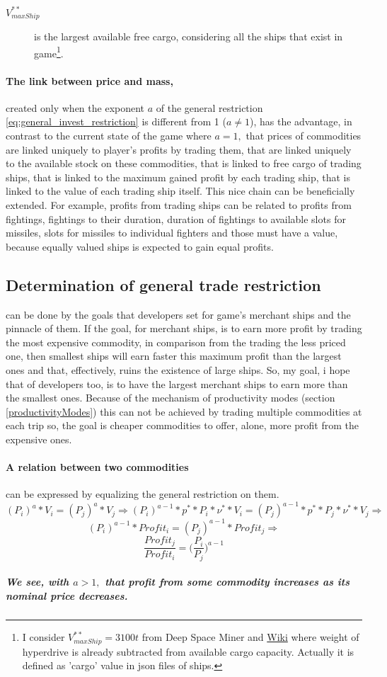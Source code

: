 \documentclass[]{article}
\begin{document}
\begin{description}
	\item[$V^{**}_{maxShip}$] is the largest available free cargo, considering all the ships that exist in game\footnote{I consider $V^{**}_{maxShip}=3100t$ from Deep Space Miner and \hyperref{https://pioneerwiki.com/wiki/Category:Ships}{}{}{Wiki} where weight of hyperdrive is already subtracted from available cargo capacity. Actually it is defined as 'cargo' value in json files of ships.}.
\end{description}
\paragraph{The link between price and mass,} created only when the exponent $a$ of the general restriction \eqref{eq:general_invest_restriction} is different from 1 ($a\neq 1$), has the advantage, in contrast to the current state of the game where $a=1,$ that prices of commodities are linked uniquely to player's profits by trading them, that are linked uniquely to the available stock on these commodities, that is linked to free cargo of trading ships, that is linked to the maximum gained profit by each trading ship, that is linked to the value of each trading ship itself. This nice chain can be beneficially extended. For example, profits from trading ships can be related to profits from fightings, fightings to their duration, duration of fightings to available slots for missiles, slots for missiles to individual fighters and those must have a value, because equally valued ships is expected to gain equal profits.
\subsection{Determination of general trade restriction} can be done by the goals that developers set for game's merchant ships and the pinnacle of them. If the goal, for merchant ships, is to earn more profit by trading the most expensive commodity, in comparison from the trading  the less priced one, then smallest ships will earn faster this maximum profit than the largest ones and that, effectively, ruins the existence of large ships. So, my goal, i hope that of developers too, is to have the largest merchant ships to earn more than the smallest ones. Because of the mechanism of productivity modes (section \ref{productivityModes}) this can not be achieved by trading multiple commodities at each trip so, the goal is cheaper commodities to offer, alone, more profit from the expensive ones.
\paragraph{A relation between two commodities} can be expressed by equalizing the general restriction on them.
\[(P_{i})^{a}*V_{i}=(P_{j})^{a}*V_{j}\Rightarrow (P_{i})^{a-1}*p^{*}*P_{i}*\nu^{*}*V_{i}=(P_{j})^{a-1}*p^{*}*P_{j}*\nu^{*}*V_{j}\Rightarrow\]
\[(P_{i})^{a-1}*Profit_{i}=(P_{j})^{a-1}*Profit_{j}\Rightarrow\]
\begin{equation}\label{eq:profitRatio_ij}
	\dfrac{Profit_{j}}{Profit_{i}}=\Big(\dfrac{P_{i}}{P_{j}}\Big)^{a-1}
\end{equation}
\subparagraph*{We see, with $a>1,$ that profit from some commodity increases as its nominal price decreases.}
\end{document}
